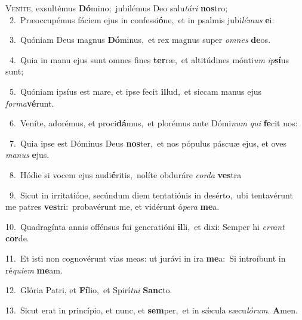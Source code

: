 \lettrine{\initial\textcolor{\initialcolor}{V}}{eníte,} exsultémus \textbf{Dó}\-mino;~\star jubilémus Deo salu\-\textit{tá}\-\textit{ri} \textbf{nos}\-tro;\\
{\numbfont\textcolor{\numbcolor}{~2.}}~Præoccupémus fáciem ejus in confessi\-\textbf{ó}\-ne,~\star et in psalmis jubi\-\textit{lé}\-\textit{mus} \textbf{e}\-i:\par
{\numbfont\textcolor{\numbcolor}{~3.}}~Quóniam Deus magnus \textbf{Dó}\-minus,~\star et rex magnus super \textit{om}\-\textit{nes} \textbf{de}\-os.\par
{\numbfont\textcolor{\numbcolor}{~4.}}~Quia in manu ejus sunt omnes fines \textbf{ter}\-ræ,~\star et altitúdines mónti\textit{um} \textit{ip}\-\textbf{sí}us sunt;\par
{\numbfont\textcolor{\numbcolor}{~5.}}~Quóniam ipsíus est mare, et ipse fecit \textbf{il}\-lud,~\star et siccam manus ejus \textit{for}\-\textit{ma}\textbf{vé}runt.\par
{\numbfont\textcolor{\numbcolor}{~6.}}~Veníte, adorémus, et proci\-\textbf{dá}\-mus,~\star et plorémus ante Dómi\textit{num} \textit{qui} \textbf{fe}\-cit nos:\par
{\numbfont\textcolor{\numbcolor}{~7.}}~Quia ipse est Dóminus Deus \textbf{nos}\-ter,~\star et nos pópulus páscuæ ejus, et oves \textit{ma}\-\textit{nus} \textbf{e}\-jus.\par
{\numbfont\textcolor{\numbcolor}{~8.}}~Hódie si vocem ejus audi\-\textbf{é}\-ritis,~\star nolíte obduráre \textit{cor}\-\textit{da} \textbf{ves}\-tra\par
{\numbfont\textcolor{\numbcolor}{~9.}}~Sicut in irritatióne, secúndum diem tentatiónis in desérto,~\dagger ubi tentavérunt me patres \textbf{ves}\-tri:~\star probavérunt me, et vidérunt ó\-\textit{pe}\-\textit{ra} \textbf{me}\-a.\par
{\numbfont\textcolor{\numbcolor}{10.}}~Quadragínta annis offénsus fui generatióni \textbf{il}\-li,~\star et dixi: Semper hi \textit{er}\-\textit{rant} \textbf{cor}\-de.\par
{\numbfont\textcolor{\numbcolor}{11.}}~Et isti non cognovérunt vias meas: ut jurávi in ira \textbf{me}\-a:~\star Si introíbunt in ré\-\textit{qui}\-\textit{em} \textbf{me}\-am.\par
{\numbfont\textcolor{\numbcolor}{12.}}~Glória Patri, et \textbf{Fí}\-lio,~\star et Spirí\-\textit{tu}\-\textit{i} \textbf{Sanc}\-to.\par
{\numbfont\textcolor{\numbcolor}{13.}}~Sicut erat in princípio, et nunc, et \textbf{sem}\-per,~\star et in sǽcula sæcu\-\textit{ló}\-\textit{rum}. \textbf{A}\-men.\par
